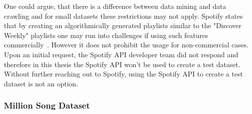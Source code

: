 One could argue, that there is a difference between data mining and data crawling and for small datasets these restrictions may not apply.
Spotify states that by creating an algorithmically generated playlists similar to the "Discover Weekly" playlists one may run into challenges if using such features commercially~\cite{spottac3}. However it does not prohibit the usage for non-commercial cases.\\ 
Upon an initial request, the Spotify API developer team did not respond and therefore in this thesis the Spotify API won't be used to create a test dataset. Without further reaching out to Spotify, using the Spotify API to create a test dataset is not an option. 

\subsubsection{Million Song Dataset}

